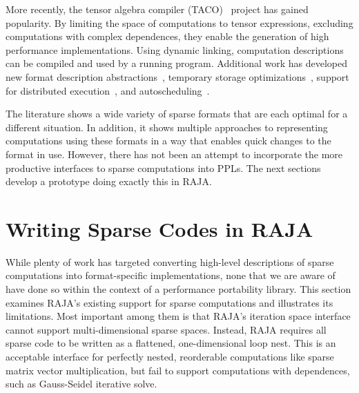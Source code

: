 More recently, the tensor algebra compiler (TACO)~\cite{kjolstad2017tensor} project has gained popularity.
By limiting the space of computations to tensor expressions, excluding computations with complex dependences, they enable the generation of high performance implementations.
Using dynamic linking, computation descriptions can be compiled and used by a running program.
Additional work has developed new format description abstractions~\cite{chou2018format}, temporary storage optimizations~\cite{kjolstad2019tensor}, support for distributed execution~\cite{yadav2022distal}, and autoscheduling~\cite{ahrens2022autoscheduling}.

The literature shows a wide variety of sparse formats that are each optimal for a different situation.
In addition, it shows multiple approaches to representing computations using these formats in a way that enables quick changes to the format in use.
However, there has not been an attempt to incorporate the more productive interfaces to sparse computations into PPLs.
The next sections develop a prototype doing exactly this in RAJA\@.

\section{Writing Sparse Codes in RAJA}\label{sec:IndexSets}

While plenty of work has targeted converting high-level descriptions of sparse computations into format-specific implementations, none that we are aware of have done so within the context of a performance portability library.
This section examines RAJA's existing support for sparse computations and illustrates its limitations.
Most important among them is that RAJA's iteration space interface cannot support multi-dimensional sparse spaces.
Instead, RAJA requires all sparse code to be written as a flattened, one-dimensional loop nest.
This is an acceptable interface for perfectly nested, reorderable computations like sparse matrix vector multiplication, but fail to support computations with dependences, such as Gauss-Seidel iterative solve.

